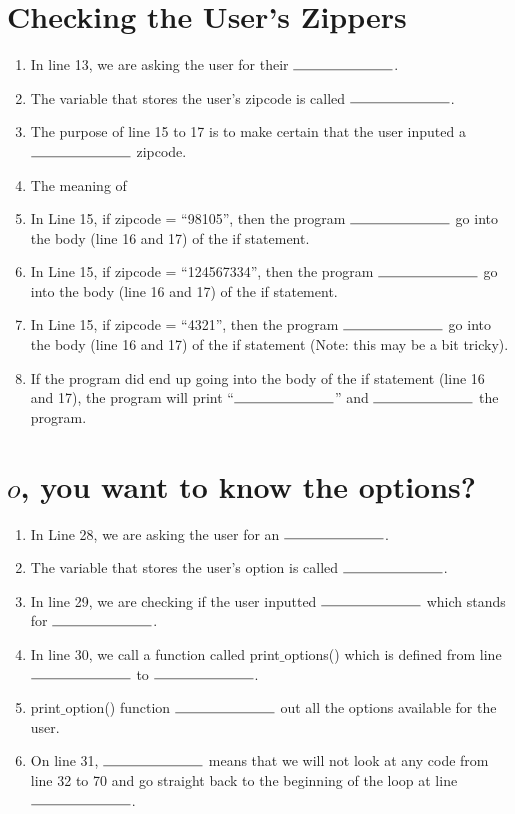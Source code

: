 \documentclass[11pt]{article}
\begin{document}
\section{Checking the User's Zippers}
\begin{enumerate}
    \item In line 13, we are asking the user for their $\rule{2.5cm}{0.15mm}$.
    \item The variable that stores the user's zipcode is called $\rule{2.5cm}{0.15mm}$.
    \item The purpose of line 15 to 17 is to make certain that the user inputed a $\rule{2.5cm}{0.15mm}$ zipcode.
    \item The meaning of 
    \item In Line 15, if zipcode = ``98105'', then the program $\rule{2.5cm}{0.15mm}$ go into the body (line 16 and 17) of the if statement.
    \item In Line 15, if zipcode = ``124567334'', then the program $\rule{2.5cm}{0.15mm}$ go into the body (line 16 and 17) of the if statement.
    \item In Line 15, if zipcode = ``4321'', then the program $\rule{2.5cm}{0.15mm}$ go into the body (line 16 and 17) of the if statement (Note: this may be a bit tricky).
    \item If the program did end up going into the body of the if statement (line 16 and 17), the program will print ``$\rule{2.5cm}{0.15mm}$'' and $\rule{2.5cm}{0.15mm}$ the program.
\end{enumerate}
\noindent\makebox[\linewidth]{\rule{\paperwidth}{0.4pt}}
\section{$o$, you want to know the options?}
\begin{enumerate}
    \item In Line 28, we are asking the user for an $\rule{2.5cm}{0.15mm}$.
    \item The variable that stores the user's option is called $\rule{2.5cm}{0.15mm}$.
    \item In line 29, we are checking if the user inputted $\rule{2.5cm}{0.15mm}$ which stands for $\rule{2.5cm}{0.15mm}$.
    \item In line 30, we call a function called print$\_$options() which is defined from line $\rule{2.5cm}{0.15mm}$ to $\rule{2.5cm}{0.15mm}$.
    \item print$\_$option() function $\rule{2.5cm}{0.15mm}$ out all the options available for the user.
    \item On line 31, $\rule{2.5cm}{0.15mm}$ means that we will not look at any code from line 32 to 70 and go straight back to the beginning of the loop at line $\rule{2.5cm}{0.15mm}$.
\end{enumerate}
\noindent\makebox[\linewidth]{\rule{\paperwidth}{0.4pt}}
\end{document}
